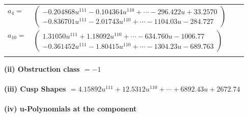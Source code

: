 \documentclass[1p]{elsarticle_modified}
\theoremstyle{definition}
\begin{document}
\begin{tabular}{m{7pt} m{180pt} m{7pt} m{180pt} }
\flushright $a_{4}=$&$\begin{pmatrix}-0.204868 u^{111}-0.104364 u^{110}+\cdots-296.422 u+33.2570\\-0.836701 u^{111}-2.01743 u^{110}+\cdots-1104.03 u-284.727\end{pmatrix}$ \\
\flushright $a_{10}=$&$\begin{pmatrix}1.31050 u^{111}+1.18092 u^{110}+\cdots-634.760 u-1006.77\\-0.361452 u^{111}-1.80415 u^{110}+\cdots-1304.23 u-689.763\end{pmatrix}$\\&\end{tabular}
\flushleft \textbf{(ii) Obstruction class $= -1$}\\~\\
\flushleft \textbf{(iii) Cusp Shapes $= 4.15892 u^{111}+12.5312 u^{110}+\cdots+6892.43 u+2672.74$}\\~\\
\newpage\renewcommand{\arraystretch}{1}
\flushleft \textbf{(iv) u-Polynomials at the component}\newline \\
\end{document}
